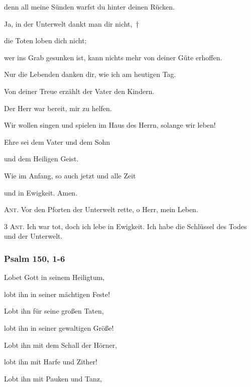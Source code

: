 denn all meine Sünden warfst du hinter deinen Rücken.

\noindent Ja, in der Unterwelt dankt man dir nicht,~†~\nopagebreak

die Toten loben dich nicht;~\GreStar{}~\nopagebreak

wer ins Grab gesunken ist, kann nichts mehr von deiner Güte erhoffen.

\noindent Nur die Lebenden danken dir, wie ich am heutigen Tag.~\GreStar{}~\nopagebreak

Von deiner Treue erzählt der Vater den Kindern.

\noindent Der Herr war bereit, mir zu helfen.~\GreStar{}~\nopagebreak

Wir wollen singen und spielen im Haus des Herrn, solange wir leben!

\noindent Ehre sei dem Vater und dem Sohn~\GreStar{}~\nopagebreak

und dem Heiligen Geist.

\noindent Wie im Anfang, so auch jetzt und alle Zeit~\GreStar{}~\nopagebreak

und in Ewigkeit. Amen.

\vspace{10pt}

\noindent \textsc{Ant.} Vor den Pforten der Unterwelt rette, o Herr, mein Leben.


\newpage

\noindent \textsc{3 Ant.} Ich war tot, doch ich lebe in Ewigkeit. Ich habe die Schlüssel des Todes und der Unterwelt.

\subsubsection{Psalm 150, 1-6}

\noindent Lobet Gott in seinem Heiligtum,~\GreStar{}~\nopagebreak

lobt ihn in seiner mächtigen Feste!

\noindent Lobt ihn für seine großen Taten,~\GreStar{}~\nopagebreak

lobt ihn in seiner gewaltigen Größe!

\noindent Lobt ihn mit dem Schall der Hörner,~\GreStar{}~\nopagebreak

lobt ihn mit Harfe und Zither!

\noindent Lobt ihn mit Pauken und Tanz,~\GreStar{}~\nopagebreak

